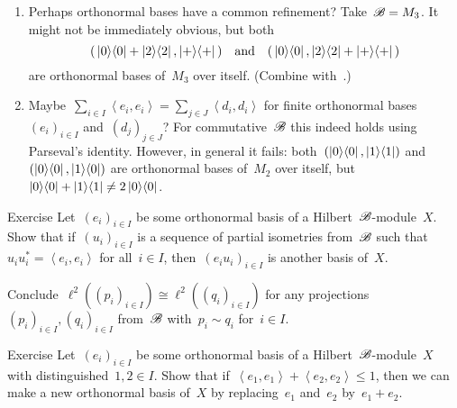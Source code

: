 \documentclass[b]{subfiles}
\begin{document}
\begin{parsec}
\begin{point}
\begin{enumerate}
\item
Perhaps orthonormal bases have a common refinement?
Take~$\mathscr{B} = M_3$.
It might not be immediately obvious, but both
\begin{equation*}
    (\,\left|0\right>\!\left<0\right| + \left|2\right>\!\left<2\right|, \left|+\right>\!\left<+\right|\,)
    \quad \text{and} \quad
    (\,\left|0\right>\!\left<0\right|, \left|2\right>\!\left<2\right|+ \left|+\right>\!\left<+\right|\,)
\end{equation*}
are orthonormal bases of~$M_3$ over itself.
(Combine  with~.)

\item
Maybe~$\sum_{i\in I} \left<e_i,e_i\right> = \sum_{j\in J} \left<d_i,d_i\right>$
    for finite orthonormal bases~$(e_i)_{i \in I}$ and~$(d_j)_{j \in J}$?
For commutative~$\mathscr{B}$ this indeed holds using Parseval's identity.
However, in general it fails:
both~$(\left|0\right>\!\left<0\right|, \left|1\right>\!\left<1\right|)$ and
    $(\left|0\right>\!\left<0\right|, \left|1\right>\!\left<0\right|)$ are orthonormal bases of~$M_2$ over itself,
    but~$\left|0\right>\!\left<0\right|+ \left|1\right>\!\left<1\right| \neq 2 \left|0\right>\!\left<0\right|$.
\end{enumerate}
\end{point}
\begin{point}[onb1]{Exercise}%
Let~$(e_i)_{ i \in I}$ be some orthonormal basis of a Hilbert~$\mathscr{B}$-module~$X$.
Show that if~$(u_i)_{i \in I}$
    is a sequence of partial isometries from~$\mathscr{B}$
    such that~$u_iu_i^* = \left<e_i,e_i\right>$
    for all~$i \in I$,
    then~$(e_iu_i)_{i \in I}$
    is another basis of~$X$.

Conclude~$\ell^2((p_i)_{i \in I}) \cong \ell^2((q_i)_{i \in I})$
for any projections~$(p_i)_{i\in I}, (q_i)_{i\in I} $
from~$\mathscr{B}$
with~$p_i \sim q_i$ for~$i \in I$.
\end{point}

\begin{point}[onb2]{Exercise}%
Let~$(e_i)_{ i \in I}$ be some orthonormal basis of a Hilbert~$\mathscr{B}$-module~$X$
    with distinguished~$1,2 \in I$.
Show that if~$\left<e_1,e_1\right> + \left<e_2,e_2\right> \leq 1$,
    then we can make a new orthonormal basis of~$X$ by  replacing~$e_1$ and~$e_2$
        by~$e_1 + e_2$.


\end{point}
\end{parsec}
\end{document}
